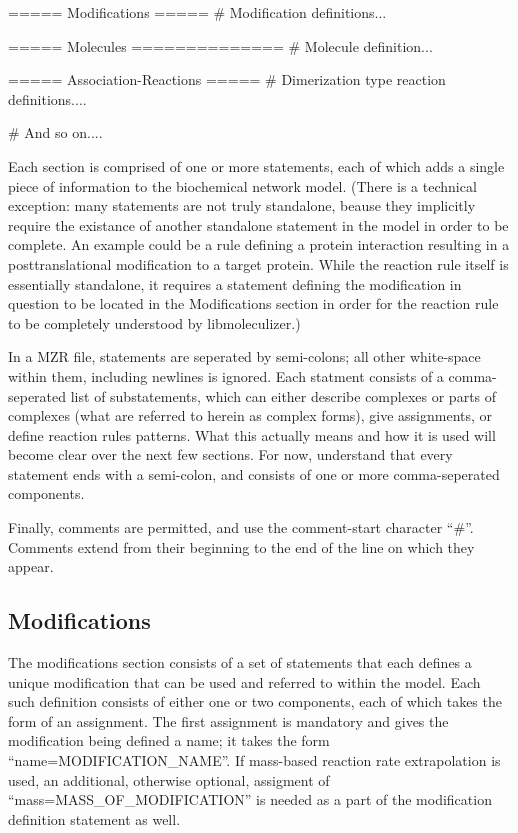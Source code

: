 \begin{ExampleMZR}[title={the caption}, caption={a caption}]
===== Modifications =====
  # Modification definitions...

===== Molecules ==============
  # Molecule definition...

=====  Association-Reactions =====
  # Dimerization type reaction definitions....

# And so on....
\end{ExampleMZR}
 
Each section is comprised of one or more statements, each of which
adds a single piece of information to the biochemical network
model. (There is a technical exception: many statements are not truly
standalone, beause they implicitly require the existance of another
standalone statement in the model in order to be complete.  An example
could be a rule defining a protein interaction resulting in a
posttranslational modification to a target protein.  While the
reaction rule itself is essentially standalone, it requires a
statement defining the modification in question to be located in the
Modifications section in order for the reaction rule to be completely
understood by libmoleculizer.)

In a MZR file, statements are seperated by semi-colons; all other
white-space within them, including newlines is ignored.  Each statment
consists of a comma-seperated list of substatements, which can either
describe complexes or parts of complexes (what are referred to herein
as complex forms), give assignments, or define reaction rules
patterns.  What this actually means and how it is used will
become clear over the next few sections.  For now, understand that
every statement ends with a semi-colon, and consists of one or more
comma-seperated components.

Finally, comments are permitted, and use the comment-start character
``\#''.  Comments extend from their beginning to the end of the line on
which they appear.

\subsection{Modifications}
The modifications section consists of a set of statements that each
defines a unique modification that can be used and referred to within
the model.  Each such definition consists of either one or two
components, each of which takes the form of an assignment.  The first
assignment is mandatory and gives the modification being defined a
name; it takes the form ``name=MODIFICATION\_NAME''.  If mass-based
reaction rate extrapolation is used, an additional, otherwise
optional, assigment of ``mass=MASS\_OF\_MODIFICATION'' is needed as a
part of the modification definition statement as well.

